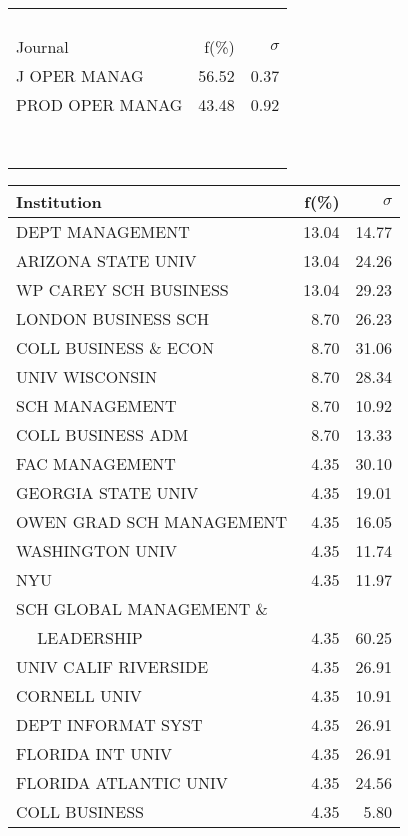 \documentclass[a4paper,11pt]{report}
\begin{document}
\begin{landscape}
\begin{table}[!ht]
{\begin{tabular}{|l r  r|}
 &  & \\
 &  & \\
 &  & \\
 &  & \\
\hline
\hline
Journal & f(\%) & $\sigma$\\
\hline
J OPER MANAG & 56.52 & 0.37\\
PROD OPER MANAG & 43.48 & 0.92\\
 &  & \\
 &  & \\
 &  & \\
 &  & \\
 &  & \\
 &  & \\
 &  & \\
 &  & \\
\hline
\end{tabular}
}
{\scriptsize\begin{tabular}{|l r r|}
\hline
Institution & f(\%) & $\sigma$\\
\hline
DEPT MANAGEMENT & 13.04 & 14.77\\
ARIZONA STATE UNIV & 13.04 & 24.26\\
WP CAREY SCH BUSINESS & 13.04 & 29.23\\
LONDON BUSINESS SCH & 8.70 & 26.23\\
COLL BUSINESS \& ECON & 8.70 & 31.06\\
UNIV WISCONSIN & 8.70 & 28.34\\
SCH MANAGEMENT & 8.70 & 10.92\\
COLL BUSINESS ADM & 8.70 & 13.33\\
FAC MANAGEMENT & 4.35 & 30.10\\
GEORGIA STATE UNIV & 4.35 & 19.01\\
OWEN GRAD SCH MANAGEMENT & 4.35 & 16.05\\
WASHINGTON UNIV & 4.35 & 11.74\\
NYU & 4.35 & 11.97\\
SCH GLOBAL MANAGEMENT \& &  & \\
$\quad$ LEADERSHIP & 4.35 & 60.25\\
UNIV CALIF RIVERSIDE & 4.35 & 26.91\\
CORNELL UNIV & 4.35 & 10.91\\
DEPT INFORMAT SYST & 4.35 & 26.91\\
FLORIDA INT UNIV & 4.35 & 26.91\\
FLORIDA ATLANTIC UNIV & 4.35 & 24.56\\
COLL BUSINESS & 4.35 & 5.80\\

\end{tabular}}
\end{table}
\end{landscape}
\end{document}
